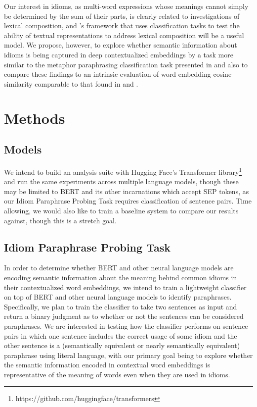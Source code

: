 \documentclass[11pt,a4paper]{article}
\begin{document}
Our interest in idioms, as multi-word expressions whose meanings cannot simply be determined by the sum of their parts, is clearly related to investigations of lexical composition, and \citet{shwartz2019pain}'s framework that uses classification tasks to test the ability of textual representations to address lexical composition will be a useful model. We propose, however, to explore whether semantic information about idioms is being captured in deep contextualized embeddings by a task more similar to the metaphor paraphrasing classification task presented in \citet{bizzoni-lappin-2018-predicting} and also to compare these findings to an intrinsic evaluation of word embedding cosine similarity comparable to that found in \citet{Wang_2019} and \citet{van_Aken_2019}.




\section{Methods}

\subsection{Models}
We intend to build an analysis suite with Hugging Face's Transformer library\footnote{https://github.com/huggingface/transformers} and run the same experiments across multiple language models, though these may be limited to BERT and its other incarnations which accept SEP tokens, as our Idiom Paraphrase Probing Task requires classification of sentence pairs. Time allowing, we would also like to train a baseline system to compare our results against, though this is a stretch goal.

\subsection{Idiom Paraphrase Probing Task}

In order to determine whether BERT and other neural language models are encoding semantic information about the meaning behind common idioms in their contextualized word embeddings, we intend to train a lightweight classifier on top of BERT and other neural language models to identify paraphrases. Specifically, we plan to train the classifier to take two sentences as input and return a binary judgment as to whether or not the sentences can be considered paraphrases. We are interested in testing how the classifier performs on sentence pairs in which one sentence includes the correct usage of some idiom and the other sentence is a (semantically equivalent or nearly semantically equivalent) paraphrase using literal language, with our primary goal being to explore whether the semantic information encoded in contextual word embeddings is representative of the meaning of words even when they are used in idioms. 
\end{document}

